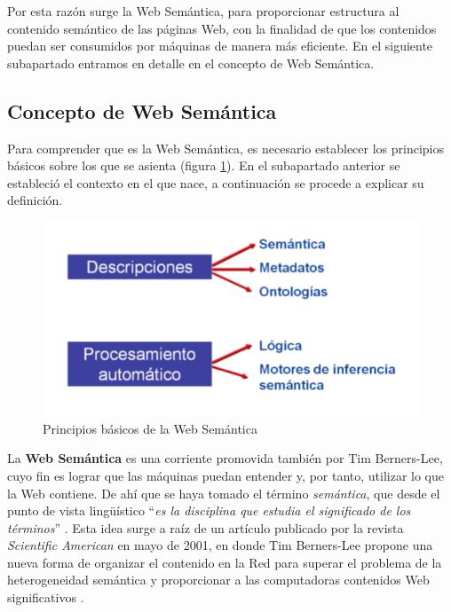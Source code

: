 Por esta razón surge la Web Semántica, para proporcionar estructura al contenido semántico de las páginas Web, con la finalidad de que los contenidos puedan ser consumidos por máquinas de manera más eficiente. En el siguiente subapartado entramos en detalle en el concepto de Web Semántica.

\subsection{Concepto de Web Semántica} 

Para comprender que es la Web Semántica, es necesario establecer los principios básicos sobre los que se asienta (figura \ref{fig:principio}). En el subapartado anterior se estableció el contexto en el que nace, a continuación se procede a explicar su definición. 

\begin{figure}[H]
	\centering
	\includegraphics[width=0.65\linewidth]{imagenes/capitulo3/principio}
	\caption{Principios básicos de la Web Semántica \cite{aplicacion}}
	\label{fig:principio}
\end{figure}

La \textbf{Web Semántica} es una corriente promovida también por Tim Berners-Lee, cuyo fin es lograr que las máquinas puedan entender y, por tanto, utilizar lo que la Web contiene. De ahí que se haya tomado el término \textit{semántica}, que desde el punto de vista lingüístico ``\textit{es la disciplina que estudia el significado de los términos}'' \cite{cwb}. Esta idea surge a raíz de un artículo publicado por la revista \textit{Scientific American} en mayo de 2001, en donde Tim Berners-Lee propone una nueva forma de organizar el contenido en la Red para superar el problema de la heterogeneidad semántica y proporcionar a las computadoras contenidos Web significativos \cite{web-semantica-w3c, libro-gis}.\\





